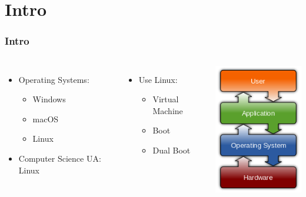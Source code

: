 

\section{Intro}
\begin{frame}
	\frametitle{Intro}

	\begin{columns}[c]
        	\begin{itemize}
            	\item Operating Systems:
                \begin{itemize}
            		\item Windows
                    \item macOS
                    \item Linux
            	\end{itemize}
                \item Computer Science UA: Linux
            \end{itemize}
            \begin{itemize}
                \item Use Linux:
                \begin{itemize}
            		\item Virtual Machine
                    \item Boot
                    \item Dual Boot
            	\end{itemize}
            \end{itemize}
            \centering
			\includegraphics[width=.7\linewidth,]{res/os}
    \end{columns}


\end{frame}
